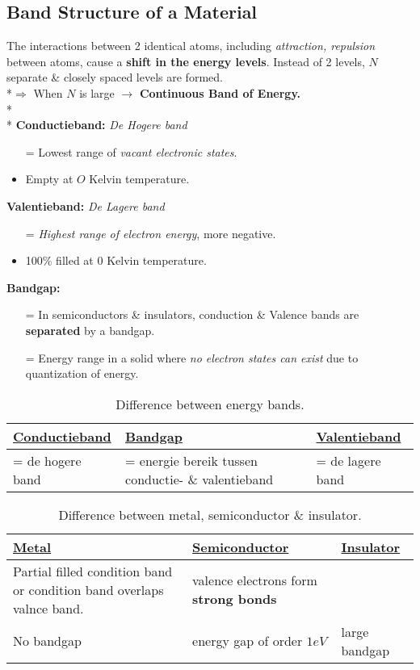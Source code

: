\subsection*{Band Structure of a Material}
The interactions between 2 identical atoms, including \textit{attraction, repulsion} between atoms, cause a \textbf{shift in the energy levels}. Instead of 2 levels, $N$ separate \& closely spaced levels are formed.
\\*$\Rightarrow$ When $N$ is large $\rightarrow$ \textbf{Continuous Band of Energy.} \\* \\*
\textbf{Conductieband:} \textit{De Hogere band}
\begin{itemize}
	\item[=] Lowest range of \textit{vacant electronic states}.
	\item Empty at $O$ Kelvin temperature.
\end{itemize}
\textbf{Valentieband:} \textit{De Lagere band}
\begin{itemize}
	\item[=] \textit{Highest range of electron energy}, more negative.
	\item 100\% filled at $0$ Kelvin temperature.
\end{itemize}
\textbf{Bandgap:}
\begin{itemize}
	\item[=] In semiconductors \& insulators, conduction \& Valence bands are \textbf{separated} by a bandgap.
	\item[=] Energy range in a solid where \textit{no electron states can exist} due to quantization of energy.
\end{itemize}
\begin{table}[h]
	\centering
	\begin{tabular}{|p{}|p{}|p{}|}
		\hline \textbf{\underline{Conductieband}} & \textbf{\underline{Bandgap}} & \textbf{\underline{Valentieband}} \\
		\hline = de hogere band & = energie bereik tussen conductie- \& valentieband  & = de lagere band \\ \hline
		
	\end{tabular}
	\caption{Difference between energy bands.}
	\label{e_bands}
\end{table}

\begin{table}
	\centering
	\begin{tabular}{|p{}|p{}|p{}|}
		\hline \textbf{\underline{Metal}} & \textbf{\underline{Semiconductor}} & \textbf{\underline{Insulator}} \\ \hline
		Partial filled condition band or condition band overlaps valnce band. & valence electrons form \textbf{strong bonds} \\ \hline
		No bandgap & energy gap of order $1eV$ & large bandgap \\ \hline
	\end{tabular}
	\caption{Difference between metal, semiconductor \& insulator.}
	\label{material_type}
\end{table}
